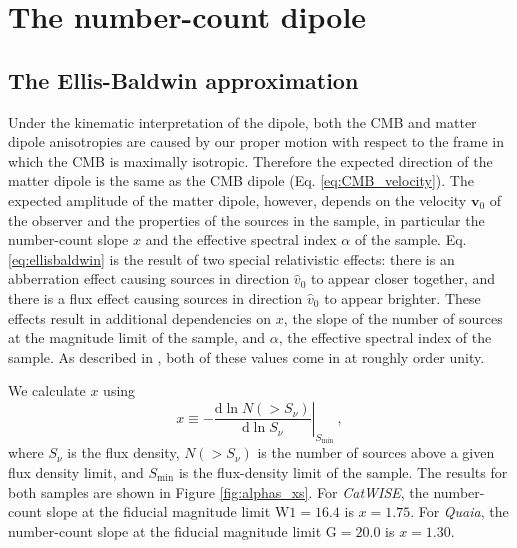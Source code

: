 \documentclass[modern]{aastex631}
\newcommand{\catwise}{\textsl{CatWISE}\xspace}
\newcommand{\quaia}{\textsl{Quaia}\xspace}
\newcommand{\vobs}{\boldsymbol{v}_0}
\newcommand{\dd}{\mathrm{d}}
\newcommand{\w}{\mathrm{W}}
\newcommand{\g}{\mathrm{G}}
\begin{document}
\section{The number-count dipole}
\label{sec:dipole_theory}

\subsection{The Ellis-Baldwin approximation}
\label{sec:EB}
Under the kinematic interpretation of the dipole, both the CMB and matter dipole anisotropies are caused by our proper motion with respect to the frame in which the CMB is maximally isotropic.
Therefore the expected direction of the matter dipole is the same as the CMB dipole (Eq. \ref{eq:CMB_velocity}).
The expected amplitude of the matter dipole, however, depends on the velocity $\vobs$ of the observer and the properties of the sources in the sample, in particular the number-count slope $x$ and the effective spectral index $\alpha$ of the sample.
Eq. \ref{eq:ellisbaldwin} is the result of two special relativistic effects: there is an abberration effect causing sources in direction $\hat{v}_0$ to appear closer together, and there is a flux effect causing sources in direction $\hat{v}_0$ to appear brighter.
These effects result in additional dependencies on $x$, the slope of the number of sources at the magnitude limit of the sample, and $\alpha$, the effective spectral index of the sample.
As described in \citet{ellis_expected_1984}, both of these values come in at roughly order unity.

We calculate $x$ using
\begin{equation}
    x \equiv -\left.\frac{\dd\ln N(>S_\nu)}{\dd\ln S_\nu}\right|_{S_\mathrm{min}} ~,
\end{equation}
where $S_\nu$ is the flux density, $N(>S_\nu)$ is the number of sources above a given flux density limit, and $S_\mathrm{min}$ is the flux-density limit of the sample.
The results for both samples are shown in Figure \ref{fig:alphas_xs}.
For \catwise, the number-count slope at the fiducial magnitude limit $\w 1=16.4$ is $x=1.75$.
For \quaia, the number-count slope at the fiducial magnitude limit $\g =20.0$ is $x=1.30$.
\end{document}
